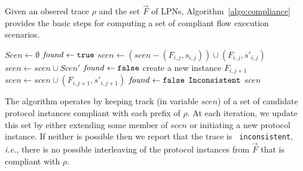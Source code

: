 \documentclass[conference]{IEEEtran}
\newcommand{\ie}{\mbox{{\em i.e.}}}
\begin{document}
Given an obsered trace $\rho$ and the set $\vec{F}$ of LPNs,
Algorithm~\ref{algo:compliance} provides the basic steps for
computing a set of compliant flow execution scenarios.
\begin{algorithm}[ht]
\DontPrintSemicolon
$\mathit{Scen} \gets \emptyset$\;
 {
$\mathit{found} \gets {\tt true}$ \;
   {
     {
      $\mathit{scen} \gets (\mathit{scen} - (F_{i,j}, s_{i,j})) \cup (F_{i,j}, s'_{i,j})$\;
      $\mathit{scen} \gets \mathit{scen} \cup \mathit{Scen}'$\;
      $\mathit{found} \gets {\tt false}$ \;
    }
  }
   {
      create a new instance $F_{i, j+1}$ \;
       {
    $\mathit{scen} \gets \mathit{scen} \cup (F_{i,j+1}, s'_{i,j+1})$ \;
        $\mathit{found} \gets {\tt false}$ \;
      }
    }
   {
    \Return ${\tt Inconsistent}$\;
  }
}
\Return $\mathit{scen}$ \;
\caption{$\textsc{Check-Compliance}(\vec{F}, \, \rho)$}
\label{algo:compliance}
\end{algorithm}
The algorithm operates by keeping track (in variable
$\mathit{scen}$) of a set of candidate protocol instances
compliant with each prefix of $\rho$.  At each iteration, we
update this set by either extending some member of
$\mathit{scen}$ or initiating a new protocol instance.  If
neither is possible then we report that the trace is {\tt
  inconsistent}, \ie, there is no possible interleaving of
the protocol instances from $\vec{F}$ that is compliant with
$\rho$.



\end{document}
